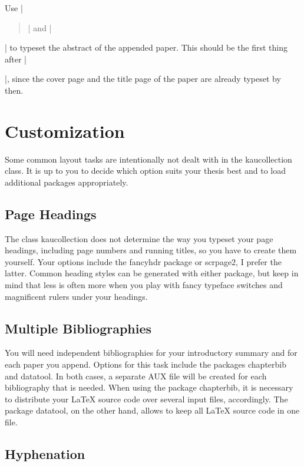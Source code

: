 \documentclass[a4paper]{ltxguide}
\begin{document}
Use |\begin{abstract}| and |\end{abstract}| to typeset the abstract of the appended paper. This should be the first thing after |\begin{kaupaper}|, since the cover page and the title page of the paper are already typeset by then.

\section{Customization}

Some common layout tasks are intentionally not dealt with in the \textsf{kaucollection} class. It is up to you to decide which option suits your thesis best and to load additional packages appropriately.

\subsection{Page Headings}

The class \textsf{kaucollection} does not determine the way you typeset your page headings, including page numbers and running titles, so you have to create them yourself. Your options include the \textsf{fancyhdr} package or \textsf{scrpage2}, I prefer the latter. Common heading styles can be generated with either package, but keep in mind that less is often more when you play with fancy typeface switches and magnificent rulers under your headings.

\subsection{Multiple Bibliographies}

You will need independent bibliographies for your introductory summary and for each paper you append. Options for this task include the packages \textsf{chapterbib} and \textsf{datatool}. In both cases, a separate AUX file will be created for each bibliography that is needed. When using the package \textsf{chapterbib}, it is necessary to distribute your \LaTeX{} source code over several input files, accordingly. The package \textsf{datatool}, on the other hand, allows to keep all \LaTeX{} source code in one file.

\subsection{Hyphenation}
 

\end{kaupaper}
\end{document}
